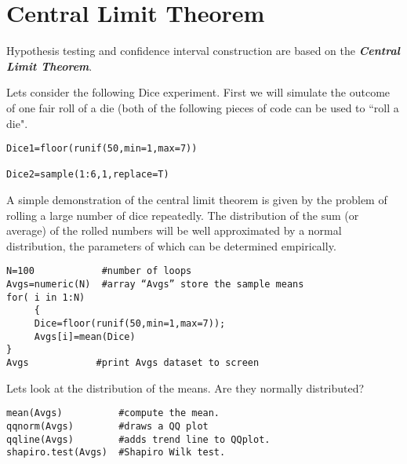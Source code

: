 \section{Central Limit Theorem}

Hypothesis testing and confidence interval construction are based on the \textbf{\textit{Central Limit Theorem}}.

Lets consider the following Dice experiment. First we will simulate the outcome of one fair roll of a die (both of the following pieces of code can be used to ``roll a die".
\begin{framed}
\begin{verbatim}
Dice1=floor(runif(50,min=1,max=7))  

Dice2=sample(1:6,1,replace=T)
\end{verbatim}
\end{framed}

A simple demonstration of the central limit theorem is given by the problem of rolling a large number of dice repeatedly. 
The distribution of the sum (or average) of the rolled numbers will be well approximated by a normal distribution, the parameters of which can be determined empirically.
\begin{framed}
\begin{verbatim} 
N=100            #number of loops
Avgs=numeric(N)  #array “Avgs” store the sample means
for( i in 1:N)
     { 
     Dice=floor(runif(50,min=1,max=7));
     Avgs[i]=mean(Dice)  
}                                 
Avgs            #print Avgs dataset to screen
\end{verbatim}
\end{framed}
Lets look at the distribution of the means. Are they normally distributed?

\begin{framed}
\begin{verbatim}
mean(Avgs)          #compute the mean. 
qqnorm(Avgs)        #draws a QQ plot
qqline(Avgs)        #adds trend line to QQplot.
shapiro.test(Avgs)  #Shapiro Wilk test. 
\end{verbatim}
\end{framed}


